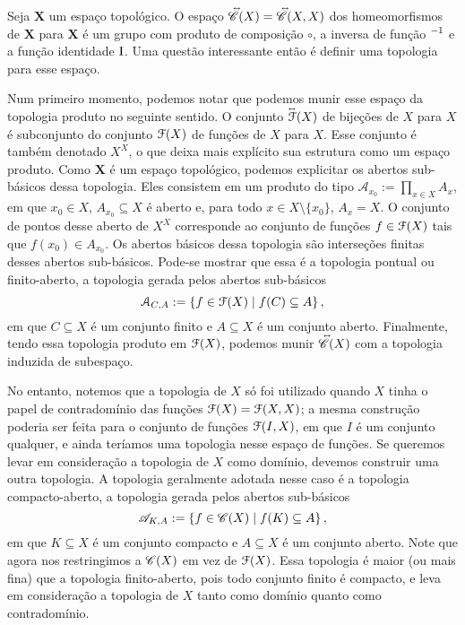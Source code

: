Seja $\bm X$ um espaço topológico. O espaço $\accentset{\leftrightarrow}{\mathscr{C}}(X) = \accentset{\leftrightarrow}{\mathscr{C}}(X,X)$ dos homeomorfismos de $\bm X$ para $\bm X$ é um grupo com produto de composição $\circ$, a inversa de função $^{-1}$ e a função identidade $\mathrm{I}$. Uma questão interessante então é definir uma topologia para esse espaço.

Num primeiro momento, podemos notar que podemos munir esse espaço da topologia produto no seguinte sentido. O conjunto $\accentset{\leftrightarrow}{\mathcal{F}}(X)$ de bijeções de $X$ para $X$ é subconjunto do conjunto $\mathcal{F}(X)$ de funções de $X$ para $X$. Esse conjunto é também denotado $X^X$, o que deixa mais explícito sua estrutura como um espaço produto. Como $\bm X$ é um espaço topológico, podemos explicitar os abertos sub-básicos dessa topologia. Eles consistem em um produto do tipo $\mathcal A_{x_0} := \prod_{x \in X} A_x$, em que $x_0 \in X$, $A_{x_0} \subseteq X$ é aberto e, para todo $x \in X \setminus \{x_0\}$, $A_x = X$. O conjunto de pontos desse aberto de $X^X$ corresponde ao conjunto de funções $f \in \mathcal{F}(X)$ tais que $f(x_0) \in A_{x_0}$. Os abertos básicos dessa topologia são interseções finitas desses abertos sub-básicos. Pode-se mostrar que essa é a topologia pontual ou finito-aberto, a topologia gerada pelos abertos sub-básicos
	\begin{equation*}
	\mathcal A_{C,A} := \left\{{f \in \mathcal{F}(X)}\;\middle\vert\;{f(C) \subseteq A}\right\},
	\end{equation*}
em que $C \subseteq X$ é um conjunto finito e $A \subseteq X$ é um conjunto aberto. Finalmente, tendo essa topologia produto em $\mathcal{F}(X)$, podemos munir $\accentset{\leftrightarrow}{\mathscr{C}}(X)$ com a topologia induzida de subespaço.

No entanto, notemos que a topologia de $X$ só foi utilizado quando $X$ tinha o papel de contradomínio das funções $\mathcal{F}(X)=\mathcal{F}(X,X)$; a mesma construção poderia ser feita para o conjunto de funções $\mathcal{F}(I,X)$, em que $I$ é um conjunto qualquer, e ainda teríamos uma topologia nesse espaço de funções. Se queremos levar em consideração a topologia de $X$ como domínio, devemos construir uma outra topologia. A topologia geralmente adotada nesse caso é a topologia compacto-aberto, a topologia gerada pelos abertos sub-básicos
	\begin{equation*}
	\mathscr A_{K,A} := \left\{{f \in \mathscr{C}(X)}\;\middle\vert\;{f(K) \subseteq A}\right\},
	\end{equation*}
em que $K \subseteq X$ é um conjunto compacto e $A \subseteq X$ é um conjunto aberto. Note que agora nos restringimos a $\mathscr{C}(X)$ em vez de $\mathcal{F}(X)$. Essa topologia é maior (ou mais fina) que a topologia finito-aberto, pois todo conjunto finito é compacto, e leva em consideração a topologia de $X$ tanto como domínio quanto como contradomínio.

